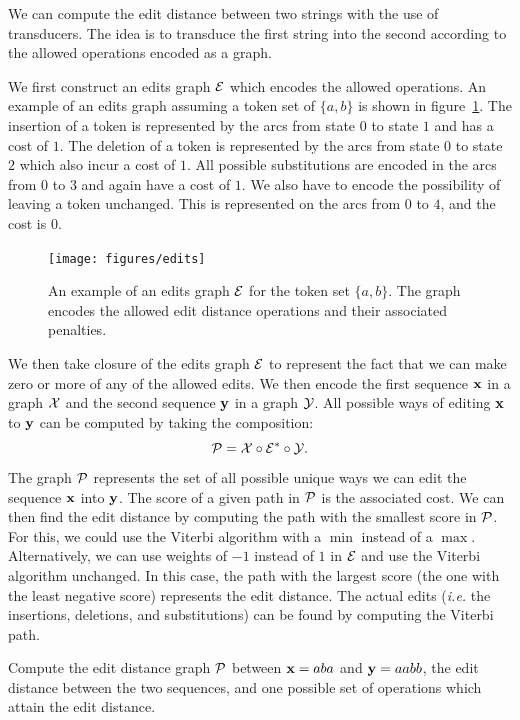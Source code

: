 We can compute the edit distance between two strings with the use of
transducers. The idea is to transduce the first string into the second
according to the allowed operations encoded as a graph.

We first construct an edits graph $\mathcal{E}$ which encodes the allowed operations.
An example of an edits graph assuming a token set of $\{a, b\}$ is shown in
figure~\ref{fig:edits}. The insertion of a token is represented by the arcs
from state $0$ to state $1$ and has a cost of $1$. The deletion of a token is
represented by the arcs from state $0$ to state $2$ which also incur a cost of
$1$. All possible substitutions are encoded in the arcs from $0$ to $3$ and
again have a cost of $1$. We also have to encode the possibility of leaving a
token unchanged. This is represented on the arcs from $0$ to $4$, and the cost
is $0$.

\begin{figure}
    \centering
    \texttt{[image: figures/edits]}
    \caption{An example of an edits graph $\mathcal{E}$ for the token set $\{a, b\}$.
    The graph encodes the allowed edit distance operations and their associated
    penalties.}
    \label{fig:edits}
\end{figure}

We then take closure of the edits graph $\mathcal{E}$ to represent the fact that we can
make zero or more of any of the allowed edits. We then encode the first
sequence ${\bf x}$ in a graph $\mathcal{X}$ and the second sequence ${\bf y}$ in a graph $\mathcal{Y}$.
All possible ways of editing ${\bf x}$ to ${\bf y}$ can be computed by taking the
composition:
$$
\mathcal{P} = \mathcal{X} \circ \mathcal{E}^* \circ \mathcal{Y}.
$$
The graph $\mathcal{P}$ represents the set of all possible unique ways we can edit the
sequence ${\bf x}$ into ${\bf y}$. The score of a given path in $\mathcal{P}$ is the associated
cost. We can then find the edit distance by computing the path with the
smallest score in $\mathcal{P}$. For this, we could use the Viterbi algorithm with a
$\min$ instead of a $\max$. Alternatively, we can use weights of $-1$ instead
of $1$ in $\mathcal{E}$ and use the Viterbi algorithm unchanged. In this case, the path
with the largest score (the one with the least negative score) represents the
edit distance. The actual edits (\emph{i.e.} the insertions, deletions, and
substitutions) can be found by computing the Viterbi path.

\begin{example}[\unskip\nopunct]
Compute the edit distance graph $\mathcal{P}$ between ${\bf x} = aba$ and ${\bf y} = aabb$, the
edit distance between the two sequences, and one possible set of operations
which attain the edit distance.
\end{example}

